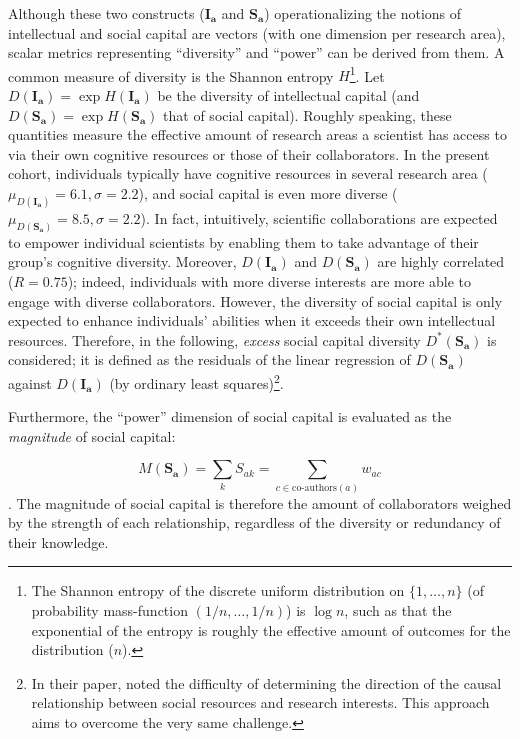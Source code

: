 \documentclass{article}
\begin{document}
Although these two constructs ($\bm{I_a}$ and $\bm{S_a}$) operationalizing the notions of intellectual and social capital are vectors (with one dimension per research area), scalar metrics representing ``diversity'' and ``power'' can be derived from them. A common measure of diversity is the Shannon entropy $H$\footnote{The Shannon entropy of the discrete uniform distribution on $\{1,\dots,n\}$ (of probability mass-function $(1/n,\dots,1/n)$) is $\log{n}$, such as that the exponential of the entropy is roughly the effective amount of outcomes for the distribution ($n$).}. Let 
 $D(\bm{I_a})=\exp{H(\bm{I_a})}$ be the diversity of intellectual capital (and $D(\bm{S_a})=\exp{H(\bm{S_a})}$ that of social capital). Roughly speaking, these quantities measure the effective amount of research areas a scientist has access to via their own cognitive resources or those of their collaborators. In the present cohort,  individuals typically have cognitive resources in several research area ($\mu_{D(\bm{I_a})}=6.1,\sigma=2.2$), and social capital is even more diverse ($\mu_{D(\bm{S_a})}=8.5,\sigma=2.2$). In fact, intuitively,  scientific collaborations are expected to empower individual scientists by enabling them to take advantage of their group's cognitive diversity. Moreover, $D(\bm{I_a})$ and $D(\bm{S_a})$ are highly correlated ($R=0.75$); indeed, individuals with more diverse interests are more able to engage with diverse collaborators. However, the diversity of social capital is only expected to enhance individuals' abilities when it exceeds their own intellectual resources. Therefore, in the following, \textit{excess} social capital diversity $D^{\ast}(\bm{S_a})$ is considered; it is defined as the residuals of the linear regression of $D(\bm{S_a})$ against $D(\bm{I_a})$ (by ordinary least squares)\footnote{In their paper, \citet{Tripodi2020} noted the difficulty of determining the direction of the causal relationship between social resources and research interests. This approach aims to overcome the very same challenge.}.

Furthermore, the ``power'' dimension of social capital is evaluated as the \textit{magnitude} of social capital:

\begin{equation}
    M(\bm{S_a})=\sum_k S_{ak} = \sum_{c \in \text{co-authors}(a)} w_{ac}
\end{equation}. The magnitude of social capital is therefore the amount of collaborators weighed by the strength of each relationship, regardless of the diversity or redundancy of their knowledge. %
\end{document}
